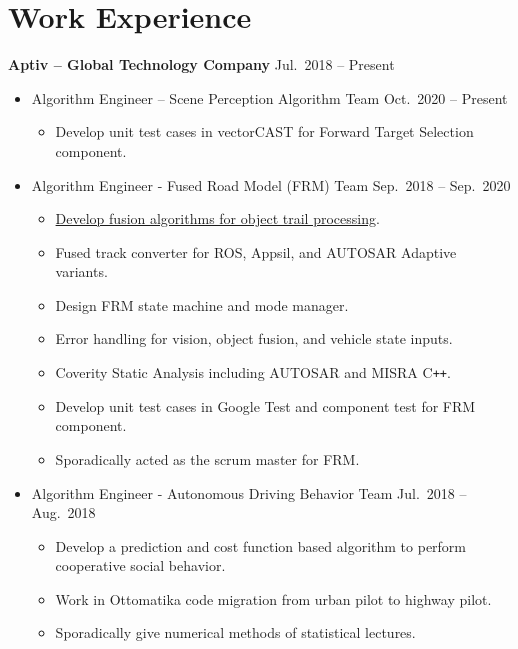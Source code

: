 \documentclass[a4paper,10pt,dvipdfmx]{article}
\begin{document}
\section*{Work Experience}
\textbf{Aptiv -- Global Technology Company} \hfill Jul.~2018 -- Present
\begin{itemize}[noitemsep,nolistsep]
  \item[] Algorithm Engineer -- Scene Perception Algorithm Team \hfill Oct.~2020 -- Present
    \begin{itemize}[noitemsep,nolistsep]
      \item Develop unit test cases in vectorCAST for Forward Target Selection component.
    \end{itemize}
  \item[] Algorithm Engineer - Fused Road Model (FRM) Team \hfill Sep.~2018 -- Sep.~2020
    \begin{itemize}[noitemsep,nolistsep]
      \item \href{https://chris7462.github.io/Demo/lane_centerlines_prediction.mp4}{Develop fusion algorithms for object trail processing}.
      \item Fused track converter for ROS, Appsil, and AUTOSAR Adaptive variants.
      \item Design FRM state machine and mode manager.
      \item Error handling for vision, object fusion, and vehicle state inputs.
      \item Coverity Static Analysis including AUTOSAR and MISRA \textsf{C}\texttt{++}.
      \item Develop unit test cases in Google Test and component test for FRM component.
      \item Sporadically acted as the scrum master for FRM.
    \end{itemize}
  \item[] Algorithm Engineer - Autonomous Driving Behavior Team \hfill Jul.~2018 -- Aug.~2018
    \begin{itemize}[noitemsep,nolistsep]
      \item Develop a prediction and cost function based algorithm to perform cooperative social behavior.
      \item Work in Ottomatika code migration from urban pilot to highway pilot.
      \item Sporadically give numerical methods of statistical lectures.\\
    \end{itemize}
\end{itemize}
\end{document}
